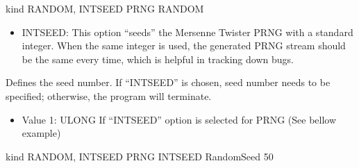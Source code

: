 \documentclass[letterpaper,10pt,english]{sphinxmanual}
\begin{document}
\begin{description}
\begin{itemize}
\begin{sphinxVerbatim}[commandchars=\\\{\}]
\PYGZsh{}\PYGZsh{}\PYGZsh{}\PYGZsh{}\PYGZsh{}\PYGZsh{}\PYGZsh{}\PYGZsh{}\PYGZsh{}\PYGZsh{}\PYGZsh{}\PYGZsh{}\PYGZsh{}\PYGZsh{}\PYGZsh{}\PYGZsh{}\PYGZsh{}\PYGZsh{}\PYGZsh{}\PYGZsh{}\PYGZsh{}\PYGZsh{}\PYGZsh{}\PYGZsh{}\PYGZsh{}\PYGZsh{}\PYGZsh{}\PYGZsh{}\PYGZsh{}\PYGZsh{}\PYGZsh{}\PYGZsh{}\PYGZsh{}
\PYGZsh{} kind \PYGZob{}RANDOM, INTSEED\PYGZcb{}
\PYGZsh{}\PYGZsh{}\PYGZsh{}\PYGZsh{}\PYGZsh{}\PYGZsh{}\PYGZsh{}\PYGZsh{}\PYGZsh{}\PYGZsh{}\PYGZsh{}\PYGZsh{}\PYGZsh{}\PYGZsh{}\PYGZsh{}\PYGZsh{}\PYGZsh{}\PYGZsh{}\PYGZsh{}\PYGZsh{}\PYGZsh{}\PYGZsh{}\PYGZsh{}\PYGZsh{}\PYGZsh{}\PYGZsh{}\PYGZsh{}\PYGZsh{}\PYGZsh{}\PYGZsh{}\PYGZsh{}\PYGZsh{}\PYGZsh{}
PRNG   RANDOM
\end{sphinxVerbatim}
\begin{itemize}
\item {} 
INTSEED: This option “seeds” the Mersenne Twister PRNG with a standard integer. When the same integer is used, the generated PRNG stream should be the same every time, which is helpful in tracking down bugs.

\end{itemize}

\end{itemize}

\item[{\sphinxcode{\sphinxupquote{Random\_Seed}}}] \leavevmode
Defines the seed number. If “INTSEED” is chosen, seed number needs to be specified; otherwise, the program will terminate.
\begin{itemize}
\item {} 
Value 1: ULONG \sphinxhyphen{} If “INTSEED” option is selected for PRNG (See bellow example)

\end{itemize}

\begin{sphinxVerbatim}[commandchars=\\\{\}]
\PYGZsh{}\PYGZsh{}\PYGZsh{}\PYGZsh{}\PYGZsh{}\PYGZsh{}\PYGZsh{}\PYGZsh{}\PYGZsh{}\PYGZsh{}\PYGZsh{}\PYGZsh{}\PYGZsh{}\PYGZsh{}\PYGZsh{}\PYGZsh{}\PYGZsh{}\PYGZsh{}\PYGZsh{}\PYGZsh{}\PYGZsh{}\PYGZsh{}\PYGZsh{}\PYGZsh{}\PYGZsh{}\PYGZsh{}\PYGZsh{}\PYGZsh{}\PYGZsh{}\PYGZsh{}\PYGZsh{}\PYGZsh{}\PYGZsh{}
\PYGZsh{} kind \PYGZob{}RANDOM, INTSEED\PYGZcb{}
\PYGZsh{}\PYGZsh{}\PYGZsh{}\PYGZsh{}\PYGZsh{}\PYGZsh{}\PYGZsh{}\PYGZsh{}\PYGZsh{}\PYGZsh{}\PYGZsh{}\PYGZsh{}\PYGZsh{}\PYGZsh{}\PYGZsh{}\PYGZsh{}\PYGZsh{}\PYGZsh{}\PYGZsh{}\PYGZsh{}\PYGZsh{}\PYGZsh{}\PYGZsh{}\PYGZsh{}\PYGZsh{}\PYGZsh{}\PYGZsh{}\PYGZsh{}\PYGZsh{}\PYGZsh{}\PYGZsh{}\PYGZsh{}\PYGZsh{}
PRNG          INTSEED
Random\PYGZus{}Seed    50
\end{sphinxVerbatim}


\end{description}
\end{document}
